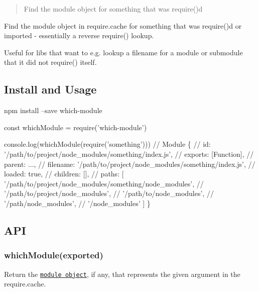 \begin{quote}
Find the module object for something that was require()d \end{quote}


\href{https://travis-ci.org/nexdrew/which-module}{\tt } \href{https://coveralls.io/github/nexdrew/which-module?branch=master}{\tt } \href{https://github.com/conventional-changelog/standard-version}{\tt }

Find the {\ttfamily module} object in {\ttfamily require.\+cache} for something that was {\ttfamily require()}d or {\ttfamily import}ed -\/ essentially a reverse {\ttfamily require()} lookup.

Useful for libs that want to e.\+g. lookup a filename for a module or submodule that it did not {\ttfamily require()} itself.

\subsection*{Install and Usage}


\begin{DoxyCode}
npm install --save which-module
\end{DoxyCode}



\begin{DoxyCode}
const whichModule = require('which-module')

console.log(whichModule(require('something')))
// Module \{
//   id: '/path/to/project/node\_modules/something/index.js',
//   exports: [Function],
//   parent: ...,
//   filename: '/path/to/project/node\_modules/something/index.js',
//   loaded: true,
//   children: [],
//   paths: [ '/path/to/project/node\_modules/something/node\_modules',
//            '/path/to/project/node\_modules',
//            '/path/to/node\_modules',
//            '/path/node\_modules',
//            '/node\_modules' ] \}
\end{DoxyCode}


\subsection*{A\+PI}

\subsubsection*{{\ttfamily which\+Module(exported)}}

Return the \href{https://nodejs.org/api/modules.html#modules_the_module_object}{\tt {\ttfamily module} object}, if any, that represents the given argument in the {\ttfamily require.\+cache}.

